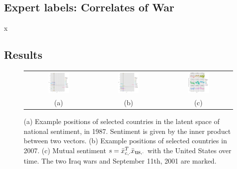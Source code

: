 \subsection{Expert labels: Correlates of War}x

\subsection{Results}
 \begin{figure}
  \begin{tabular}{ccc}
    \includegraphics[width=0.33\textwidth]{chapter_foreign_relations/figures/002_countries_by_ip_1987.pdf} &
    \includegraphics[width=0.33\textwidth]{chapter_foreign_relations/figures/002_countries_by_ip_2007.pdf} &
    \includegraphics[width=0.33\textwidth]{chapter_foreign_relations/figures/002_us_vs_everyone.pdf} \\
    (a) & (b) & (c) \\
  \end{tabular}
  \caption{
    (a) Example positions of selected countries in the latent space of national sentiment, in 1987. Sentiment is given by the inner product between two vectors.
    (b) Example positions of selected countries in 2007.
    (c) Mutual sentiment $s = \bar x_{c, \cdot}^T \bar x_{\mbox{\small us}, \cdot}$ with the United States over time. The two Iraq wars and September 11th, 2001 are marked.
  }
  \label{figure:figures}
\end{figure}

